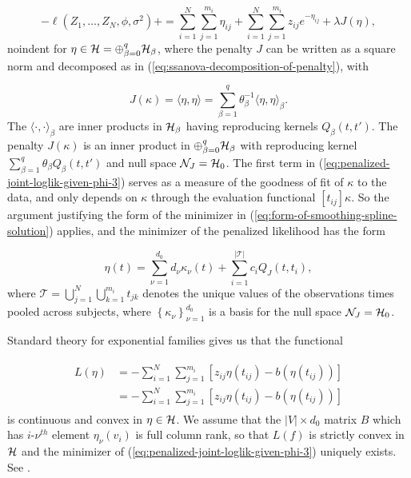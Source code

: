 \begin{equation} \label{eq:penalized-joint-loglik-given-phi-3}
-\ell\left( Z_1,\dots, Z_N, \phi, \sigma^2 \right) + =  \sum_{i = 1}^N \sum_{j = 1}^{m_i} \eta_{ij}  + \sum_{i = 1}^N \sum_{j = 1}^{m_i} z_{ij} e^{-\eta_{ij}} + \lambda J\left(\eta\right),  
\end{equation}
noindent
for $\eta \in \mathcal{H} = \oplus_{\beta = 0}^q \mathcal{H}_\beta$, where the penalty $J$ can be written as a square norm and decomposed as in (\ref{eq:ssanova-decomposition-of-penalty}), with

\begin{equation*} 
J\left(\kappa \right) = \langle \eta,\eta \rangle = \sum_{\beta = 1}^q \theta_\beta^{-1}\langle \eta,\eta \rangle_{\beta}.
\end{equation*}
\noindent 
The $\langle \cdot, \cdot \rangle_{\beta}$ are inner products in $\mathcal{H}_\beta$ having reproducing kernels $Q_\beta\left(t,t'\right)$. The penalty $J\left(\kappa\right)$ is an inner product in $\oplus_{\beta = 0}^q \mathcal{H}_\beta$ with reproducing kernel $\sum_{\beta=1}^q \theta_\beta Q_\beta\left(t, t'\right)$ and null space $\mathcal{N}_J = \mathcal{H}_0$. The first term in (\ref{eq:penalized-joint-loglik-given-phi-3}) serves as a measure of the goodness of fit of $\kappa$ to the data, and only depends on $\kappa$ through the evaluation functional $\left[t_{ij}\right]\kappa$. So the argument justifying the form of the minimizer in (\ref{eq:form-of-smoothing-spline-solution}) applies, and the minimizer of the penalized likelihood has the form 

\begin{equation} \label{eq:form-of-smoothing-spline-solution-kappa}
\eta\left( t \right) = \sum_{\nu = 1}^{d_0} d_\nu\kappa_\nu\left( t \right) + \sum_{i = 1}^{\vert \mathcal{T} \vert} c_i Q_J\left( t, t_i \right),
\end{equation}  
\noindent
where $\mathcal{T} = \bigcup_{j=1}^N\bigcup_{k=1}^{m_i} t_{jk}$ denotes the unique values of the observations times pooled across subjects, where $\left\{\kappa_\nu \right\}_{\nu=1}^{d_0}$ is a basis for the null space $\mathcal{N}_J = \mathcal{H}_0$. 

\bigskip

Standard theory for exponential families gives us that the functional 

\begin{align}
\begin{split}
L\left( \eta \right) &= -\sum_{i=1}^N \sum_{j=1}^{m_i} \left[ z_{ij} \eta\left(t_{ij}\right) - b\left(\eta\left(t_{ij}\right)\right) \right] \\
&= -\sum_{i=1}^N \sum_{j=1}^{m_i} \left[ z_{ij} \eta\left(t_{ij}\right) - b\left(\eta\left(t_{ij}\right)\right) \right]
\end{split}
\end{align}
\noindent
is continuous and convex in $\eta \in \mathcal{H}$. We assume that the $\vert V \vert \times d_0$ matrix $B$ which has $i$-$\nu^{th}$ element $\eta_\nu\left(v_i\right)$ is full column rank, so that $L\left(f\right)$ is strictly convex in $\mathcal{H}$ and the minimizer of (\ref{eq:penalized-joint-loglik-given-phi-3}) uniquely exists. See \cite{wahba1995smoothing}. 

